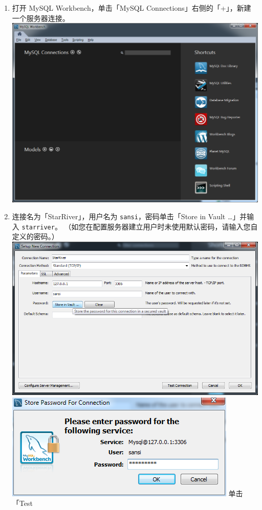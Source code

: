 \begin{enumerate}
\def\labelenumi{\arabic{enumi}.}
\itemsep1pt\parskip0pt
\item
  打开 MySQL Workbench，单击「MySQL
  Connections」右侧的「+」，新建一个服务器连接。
  \includegraphics{../img/db_init_1.png}
\item
  连接名为「StarRiver」，用户名为 \texttt{sansi}，密码单击「Store in
  Vault \ldots{}」并输入 \texttt{starriver}。
  （如您在配置服务器建立用户时未使用默认密码，请输入您自定义的密码。）
  \includegraphics{../img/db_init_2.png}
  \includegraphics{../img/db_init_3.png} 单击「Test

\end{enumerate}
